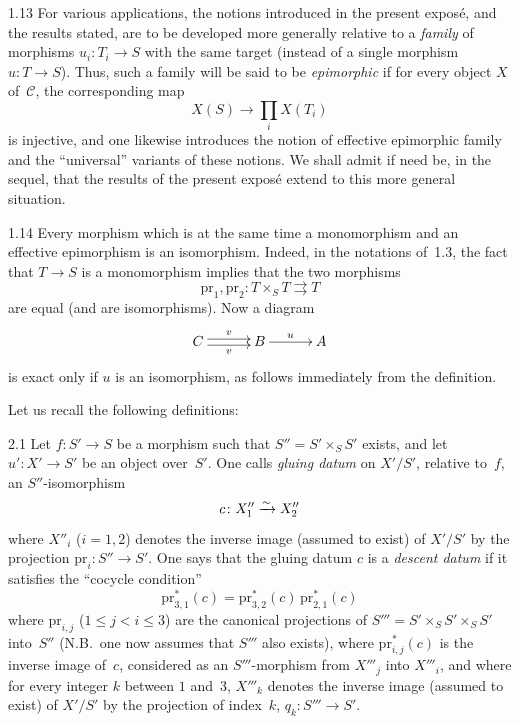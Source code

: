 \begin{remark}{1.13}
\label{IV.1.13}
For various applications, the notions introduced in the present expos\'e,
and the results stated, are to be developed more generally relative to a
\emph{family} of morphisms \(u_{i}\colon T_{i}\to S\) with the same target
(instead of a single morphism \(u\colon T\to S\)). Thus, such a family will
be said to be \emph{epimorphic} if for every object \(X\) of~\(\mathcal{C}\),
the corresponding map
\[
X(S)\longrightarrow\prod_{i}X(T_{i})
\]
is injective, and one likewise introduces the notion of effective
epimorphic family and the ``universal'' variants of these notions. We shall
admit if need be, in the sequel, that the results of the present expos\'e
extend to this more general situation.
\end{remark}

\begin{remark}{1.14}
\label{IV.1.14}
Every morphism which is at the same time a monomorphism and an effective
epimorphism is an isomorphism. Indeed, in the notations of~1.3, the fact
that \(T\to S\) is a monomorphism implies that the two morphisms
\[
\mathrm{pr}_{1},\mathrm{pr}_{2}\colon
T\times_{S}T\rightrightarrows T
\]
are equal (and are isomorphisms). Now a diagram
\[
\xymatrix@C=3em{
C \ar@<0.5ex>[r]^{v} \ar@<-0.5ex>[r]_{v}
  & B \ar[r]^{u}
  & A
}
\]
is exact only if \(u\) is an isomorphism, as follows immediately from the
definition.%
{\renewcommand{\thefootnote}{(7)}}
\end{remark}

\label{IV.sec.2}

Let us recall the following definitions:

\begin{definition}{2.1}
\label{IV.2.1}
Let \(f\colon S'\to S\) be a morphism such that \(S''=S'\times_{S}S'\)
exists, and let \(u'\colon X'\to S'\) be an object over~\(S'\). One calls
\emph{gluing datum} on \(X'/S'\), relative to~\(f\), an
\(S''\)-isomorphism
\[
c\colon X''_{1}\xrightarrow{\sim} X''_{2}
\]
where \(X''_{i}\) (\(i=1,2\)) denotes the inverse image (assumed to exist)
of \(X'/S'\) by the projection \(\mathrm{pr}_{i}\colon S''\to S'\). One says
that the gluing datum \(c\) is a \emph{descent datum} if it satisfies the
``cocycle condition''
\[
\mathrm{pr}_{3,1}^{*}(c)
=\mathrm{pr}_{3,2}^{*}(c)\,\mathrm{pr}_{2,1}^{*}(c)
\]
where \(\mathrm{pr}_{i,j}\) (\(1\leqslant j<i\leqslant 3\)) are the
canonical projections of \(S'''=S'\times_{S}S'\times_{S}S'\) into~\(S''\)
(N.B.\ one now assumes that \(S'''\) also exists), where
\(\mathrm{pr}_{i,j}^{*}(c)\) is the inverse image of~\(c\), considered as an
\(S'''\)-morphism from \(X'''_{j}\) into \(X'''_{i}\), and where for every
integer \(k\) between \(1\) and~\(3\), \(X'''_{k}\) denotes the inverse image
(assumed to exist) of \(X'/S'\) by the projection of index~\(k\),
\(q_{k}\colon S'''\to S'\).
\end{definition}
